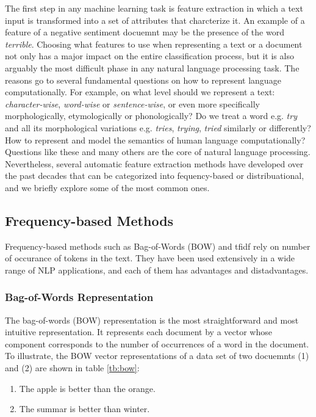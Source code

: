 The first step in any machine learning task is feature extraction in which a text input is transformed into a set of attributes that charcterize it. An example of a feature of a negative sentiment docuemnt may be the presence of the word \emph{terrible}. Choosing what features to use when representing a text or a document not only has a major impact on the entire classification process, but it is also arguably the most difficult phase in any natural language processing task. The reasons go to several fundamental questions on how to represent language computationally. For example, on what level should we represent a text: \emph{character-wise}, \emph{word-wise} or \emph{sentence-wise}, or even more specifically morphologically, etymologically or phonologically? Do we treat a word e.g. \emph{try} and all its morphological variations e.g. \emph{tries}, \emph{trying}, \emph{tried} similarly or differently? How to represent and model the semantics of human language computationally? Questions like these and many others are the core of natural language processing. Nevertheless, several automatic feature extraction methods have developed over the past decades that can be categorized into fequency-based or distribuational, and we briefly explore some of the most common ones.

\subsection{Frequency-based Methods}

Frequency-based methods such as Bag-of-Words (BOW) and tfidf rely on number of occurance of tokens in the text. They have been used extensively in a wide range of NLP applications, and each of them has advantages and distadvantages. 
\subsubsection*{Bag-of-Words Representation}

The bag-of-words (BOW) representation is the most straightforward and most intuitive
representation. It represents each document by a vector
whose component corresponds to the number of occurrences of a word in
the document.  To illustrate, the BOW vector representations of a data set of two docuemnts (1) and (2) are shown in table \ref{tb:bow}:

\begin{enumerate}
\item The apple is better than the orange.
\item The summar is better than winter. 
\end{enumerate}




